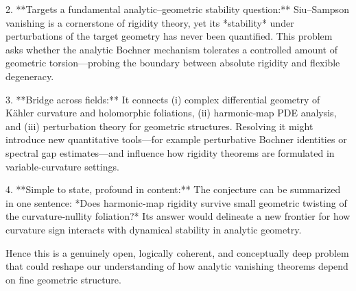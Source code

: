 2. **Targets a fundamental analytic–geometric stability question:**  
   Siu–Sampson vanishing is a cornerstone of rigidity theory, yet its *stability* under perturbations of the target geometry has never been quantified.  This problem asks whether the analytic Bochner mechanism tolerates a controlled amount of geometric torsion—probing the boundary between absolute rigidity and flexible degeneracy.

3. **Bridge across fields:**  
   It connects (i) complex differential geometry of Kähler curvature and holomorphic foliations, (ii) harmonic‑map PDE analysis, and (iii) perturbation theory for geometric structures.  Resolving it might introduce new quantitative tools—for example perturbative Bochner identities or spectral gap estimates—and influence how rigidity theorems are formulated in variable‑curvature settings.

4. **Simple to state, profound in content:**  
   The conjecture can be summarized in one sentence:  
   *Does harmonic‑map rigidity survive small geometric twisting of the curvature‑nullity foliation?*  
   Its answer would delineate a new frontier for how curvature sign interacts with dynamical stability in analytic geometry.

Hence this is a genuinely open, logically coherent, and conceptually deep problem that could reshape our understanding of how analytic vanishing theorems depend on fine geometric structure.